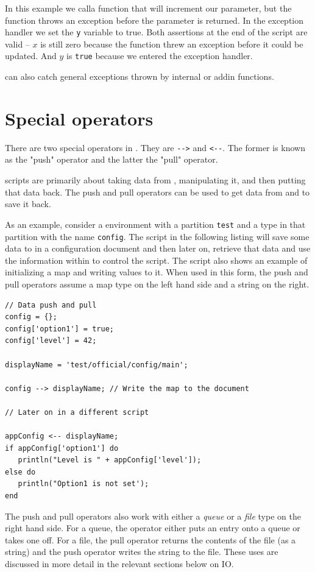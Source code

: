 In this example we calla function that will increment our parameter, but the function throws an exception before the parameter is returned. In the exception handler we set the \verb+y+ variable to true. Both assertions at the end of the script are valid -- $x$ is still zero because the function threw an exception before it could be updated. And $y$ is \verb+true+ because we entered the exception handler.

\Reflex can also catch general exceptions thrown by internal or addin functions.

\chapter{Special operators}
There are two special operators in \Reflex. They are \verb+-->+ and \verb+<--+. The former is known as the "push"  operator and the latter the "pull"  operator.

\Reflex scripts are primarily about taking data from \Rapture, manipulating it, and then putting that data back. The push and pull operators can be used to get data from \Rapture and to save it back.

As an example, consider a \Rapture environment with a partition \verb+test+ and a type in that partition with the name \verb+config+. The script in the following listing will save some data to \Rapture in a configuration document and then later on, retrieve that data and use the information within to control the script. The script also shows an example of initializing a map and writing values to it. When used in this form, the push and pull operators assume a map type on the left hand side and a string on the right.

\begin{lstlisting}[caption={Push and Pull}]
// Data push and pull
config = {};
config['option1'] = true;
config['level'] = 42;

displayName = 'test/official/config/main';

config --> displayName; // Write the map to the document

// Later on in a different script

appConfig <-- displayName;
if appConfig['option1'] do
   println("Level is " + appConfig['level']);
else do
   println("Option1 is not set');
end
\end{lstlisting}

The push and pull operators also work with either a \emph{queue} or a \emph{file} type on the right hand side. For a queue, the operator either puts an entry onto a \Rapture queue or takes one off. For a file, the pull operator returns the contents of the file (as a string) and the push operator writes the string to the file. These uses are discussed in more detail in the relevant sections below on IO.


